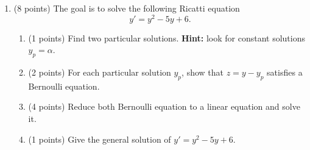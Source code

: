 \documentclass{article}
\begin{document}
\begin{enumerate}
\newpage

\item (8 points) The goal is to solve the following Ricatti equation
\[y'= y^2 -5y +6.\] 
\begin{enumerate}
\item (1 points) Find two particular solutions. \textbf{Hint:} look for constant solutions $y_p=\alpha$. 
\item (2 points) For each particular solution $y_p$, show that $z= y-y_p$ satisfies a Bernoulli equation.
\item (4 points) Reduce both Bernoulli equation to a linear equation and solve it.
\item (1 points) Give the general solution of $y'= y^2 -5y +6$. 
\end{enumerate}
\newpage
\

\newpage
\


\end{enumerate}
\end{document}
